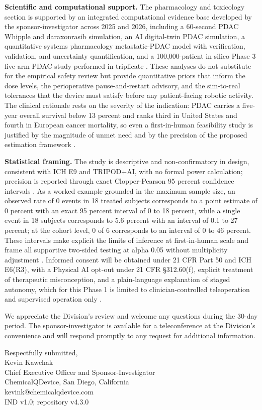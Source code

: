 \clearpage

\noindent\textbf{Scientific and computational support.} The pharmacology and toxicology section is supported by an integrated computational evidence base developed by the sponsor-investigator across 2025 and 2026, including a 60-second PDAC Whipple and daraxonrasib simulation, an AI digital-twin PDAC simulation, a quantitative systems pharmacology metastatic-PDAC model with verification, validation, and uncertainty quantification, and a 100,000-patient in silico Phase 3 five-arm PDAC study performed in triplicate \cite{qspmetpancre,fdadigtwinpc,chatgpt100kp,pdacdigtwinp}. These analyses do not substitute for the empirical safety review but provide quantitative priors that inform the dose levels, the perioperative pause-and-restart advisory, and the sim-to-real tolerances that the device must satisfy before any patient-facing robotic activity. The clinical rationale rests on the severity of the indication: PDAC carries a five-year overall survival below 13 percent and ranks third in United States and fourth in European cancer mortality, so even a first-in-human feasibility study is justified by the magnitude of unmet need and by the precision of the proposed estimation framework \cite{pdac060s2030,paipredict4x}.

\noindent\textbf{Statistical framing.} The study is descriptive and non-confirmatory in design, consistent with ICH E9 and TRIPOD+AI, with no formal power calculation; precision is reported through exact Clopper-Pearson 95 percent confidence intervals \cite{ichpaistduni,llmcomp16fda}. As a worked example grounded in the maximum sample size, an observed rate of 0 events in 18 treated subjects corresponds to a point estimate of 0 percent with an exact 95 percent interval of 0 to 18 percent, while a single event in 18 subjects corresponds to 5.6 percent with an interval of 0.1 to 27 percent; at the cohort level, 0 of 6 corresponds to an interval of 0 to 46 percent. These intervals make explicit the limits of inference at first-in-human scale and frame all supportive two-sided testing at alpha 0.05 without multiplicity adjustment \cite{ichpaistduni}. Informed consent will be obtained under 21 CFR Part 50 and ICH E6(R3), with a Physical AI opt-out under 21 CFR \S 312.60(f), explicit treatment of therapeutic misconception, and a plain-language explanation of staged autonomy, which for this Phase 1 is limited to clinician-controlled teleoperation and supervised operation only \cite{cfr050paiuni}.

\noindent We appreciate the Division's review and welcome any questions during the 30-day period. The sponsor-investigator is available for a teleconference at the Division's convenience and will respond promptly to any request for additional information.

\noindent Respectfully submitted, \\[1.0em]
Kevin Kawchak \\
Chief Executive Officer and Sponsor-Investigator \\
ChemicalQDevice, San Diego, California \\
kevink@chemicalqdevice.com \\
IND v1.0; repository v4.3.0
